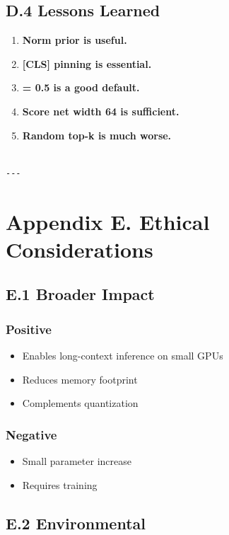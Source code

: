 \subsection{D.4 Lessons Learned}

\begin{enumerate}
\item \textbf{Norm prior is useful.}
\item \textbf{[CLS] pinning is essential.}
\item \textbf{  = 0.5 is a good default.}
\item \textbf{Score net width 64 is sufficient.}
\item \textbf{Random top-k is much worse.}
\end{enumerate}
\begin{lstlisting}

---
\end{lstlisting}

\section{Appendix E. Ethical Considerations}

\subsection{E.1 Broader Impact}

\subsubsection{Positive}
\begin{itemize}
\item Enables long-context inference on small GPUs
\item Reduces memory footprint
\item Complements quantization

\end{itemize}
\subsubsection{Negative}
\begin{itemize}
\item Small parameter increase
\item Requires training

\end{itemize}
\subsection{E.2 Environmental}

